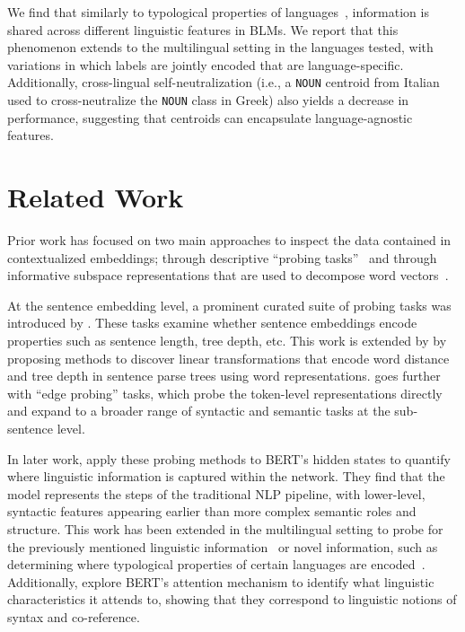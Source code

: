 \documentclass[11pt,a4paper]{article}
\begin{document}
We find that similarly to typological properties of languages~\citep{choenni_investigating_2022}, information is shared across different linguistic features in BLMs. We report that this phenomenon extends to the multilingual setting in the languages tested, with variations in which labels are jointly encoded that are language-specific. Additionally, cross-lingual self-neutralization (i.e., a \texttt{NOUN} centroid from Italian used to cross-neutralize the \texttt{NOUN} class in Greek) also yields a decrease in performance, suggesting that centroids can encapsulate language-agnostic features.

\section{Related Work}

Prior work has focused on two main approaches to inspect the data contained in contextualized embeddings; through descriptive ``probing tasks''~\citep{conneau_what_2018} and through informative subspace representations that are used to decompose word vectors~\cite{libovicky_language_2020}.

At the sentence embedding level, a prominent curated suite of probing tasks was introduced by \citet{conneau_what_2018}. These tasks examine whether sentence embeddings encode properties such as sentence length, tree depth, etc. This work is extended by \citet{hewitt_structural_2019} by proposing methods to discover linear transformations that encode word distance and tree depth in sentence parse trees using word representations. \citet{tenney_what_2018} goes further with ``edge probing'' tasks, which probe the token-level representations directly and expand to a broader range of syntactic and semantic tasks at the sub-sentence level. 

In later work, \citet{tenney_bert_2019} apply these probing methods to BERT's hidden states to quantify where linguistic information is captured within the network. They find that the model represents the steps of the traditional NLP pipeline, with lower-level, syntactic features appearing earlier than more complex semantic roles and structure. This work has been extended in the multilingual setting to probe for the previously mentioned linguistic information~\citep{ravishankar_multilingual_2019} or novel information, such as determining where typological properties of certain languages are encoded~\citep{choenni_what_2020}. Additionally, \citet{clark_what_2019} explore BERT's attention mechanism to identify what linguistic characteristics it attends to, showing that they correspond to linguistic notions of syntax and co-reference.
\end{document}
